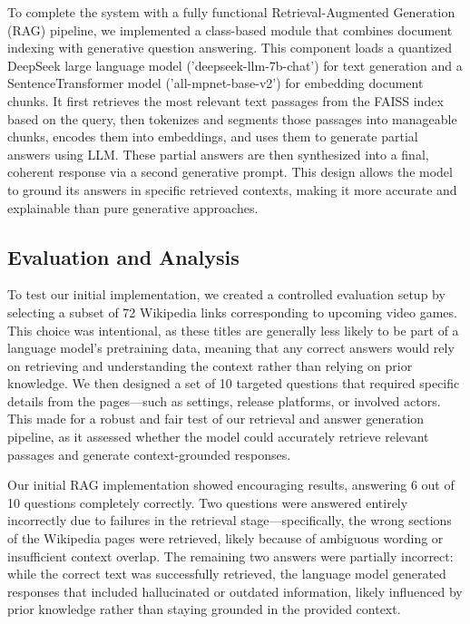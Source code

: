 \documentclass[fleqn,moreauthors,10pt]{ds_report}
\begin{document}
To complete the system with a fully functional Retrieval-Augmented Generation (RAG) pipeline, we implemented a class-based module that combines document indexing with generative question answering. This component loads a quantized DeepSeek \cite{deepseek} large language model ('deepseek-llm-7b-chat') for text generation and a SentenceTransformer model ('all-mpnet-base-v2') for embedding document chunks. It first retrieves the most relevant text passages from the FAISS index based on the query, then tokenizes and segments those passages into manageable chunks, encodes them into embeddings, and uses them to generate partial answers using LLM. These partial answers are then synthesized into a final, coherent response via a second generative prompt. This design allows the model to ground its answers in specific retrieved contexts, making it more accurate and explainable than pure generative approaches.

\subsection*{Evaluation and Analysis}
To test our initial implementation, we created a controlled evaluation setup by selecting a subset of 72 Wikipedia links corresponding to upcoming video games. This choice was intentional, as these titles are generally less likely to be part of a language model’s pretraining data, meaning that any correct answers would rely on retrieving and understanding the context rather than relying on prior knowledge. We then designed a set of 10 targeted questions that required specific details from the pages—such as settings, release platforms, or involved actors. This made for a robust and fair test of our retrieval and answer generation pipeline, as it assessed whether the model could accurately retrieve relevant passages and generate context-grounded responses. 

Our initial RAG implementation showed encouraging results, answering 6 out of 10 questions completely correctly. Two questions were answered entirely incorrectly due to failures in the retrieval stage—specifically, the wrong sections of the Wikipedia pages were retrieved, likely because of ambiguous wording or insufficient context overlap. The remaining two answers were partially incorrect: while the correct text was successfully retrieved, the language model generated responses that included hallucinated or outdated information, likely influenced by prior knowledge rather than staying grounded in the provided context.
\end{document}
